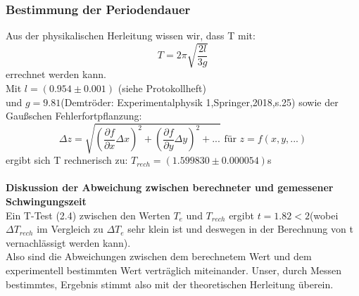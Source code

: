 \documentclass[11pt,a4paper]{article}
\begin{document}
	\subsubsection{Bestimmung der Periodendauer}
	Aus der physikalischen Herleitung wissen wir, dass T mit:
	\begin{equation}
	T=2\pi \sqrt{\frac{2l}{3g}}
	\end{equation}
	errechnet werden kann.\\
	Mit $l=(0.954\pm 0.001)$ (siehe Protokollheft) \\ und $g=9.81$(Demtröder: Experimentalphysik 1,Springer,2018,s.25)
	sowie der Gaußschen Fehlerfortpflanzung:
	\begin{equation}
	\Delta z = \sqrt{(\frac{\partial f}{\partial x}\Delta x)^2 +(\frac {\partial f}{\partial y} \Delta y)^2+...} \text{   für   } z=f(x,y,...)
	\end{equation}
	ergibt sich T rechnerisch zu: $T_{rech}=(1.599830\pm0.000054)$s\\
	\\
	{\bf Diskussion der Abweichung zwischen berechneter und gemessener Schwingungszeit}\\
	Ein T-Test (2.4) zwischen den Werten $T_e$ und $T_{rech}$ ergibt $t=1.82<2$(wobei $\Delta T_{rech}$ im Vergleich zu $\Delta T_e$ sehr klein ist und deswegen in der Berechnung von t vernachlässigt werden kann).\\
	Also sind die Abweichungen zwischen dem berechnetem Wert und dem experimentell bestimmten Wert
	verträglich miteinander. Unser, durch Messen bestimmtes, Ergebnis stimmt also mit der theoretischen Herleitung überein.
\end{document}

